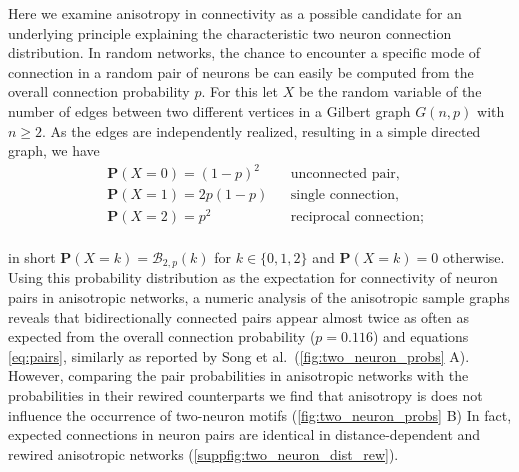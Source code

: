 Here we examine anisotropy in connectivity as a possible candidate for
an underlying principle explaining the characteristic two neuron
connection distribution. In random networks, the chance to encounter a
specific mode of connection in a random pair of neurons be can easily
be computed from the overall connection probability $p$. For this let
$X$ be the random variable of the number of edges between two
different vertices in a Gilbert graph $G(n,p)$ with $n \ge 2$. As the
edges are independently realized, resulting in a simple directed
graph, we have
\vspace{0.1cm}
\begin{equation}
  \label{eq:pairs}
  \begin{aligned}%
    & \mathbf{P}(X=0) = (1-p)^2    &&\text{unconnected pair,}  \\
    & \mathbf{P}(X=1) = 2p(1-p)    &&\text{single connection,}\\
    & \mathbf{P}(X=2) = p^2        &&\text{reciprocal connection};
  \end{aligned}%
\end{equation}
\vspace{0.1cm} \\
in short $\mathbf{P}(X=k) = \mathcal{B}_{2,p}(k)$ for $k \in
\{0,1,2\}$ and $\mathbf{P}(X=k) = 0$ otherwise. Using this probability
distribution as the expectation for connectivity of neuron pairs
in anisotropic networks, a numeric analysis of the anisotropic sample
graphs reveals that bidirectionally connected pairs appear almost
twice as often as expected from the overall connection
probability ($p=0.116$) and equations \ref{eq:pairs}, similarly as
reported by Song et al.~(\autoref{fig:two_neuron_probs} A). However,
comparing the pair probabilities in anisotropic networks with the
probabilities in their rewired counterparts we find that anisotropy is
does not influence the occurrence of two-neuron motifs
(\autoref{fig:two_neuron_probs} B) In fact, expected connections in
neuron pairs are identical in distance-dependent and rewired
anisotropic networks (\autoref{suppfig:two_neuron_dist_rew}).

